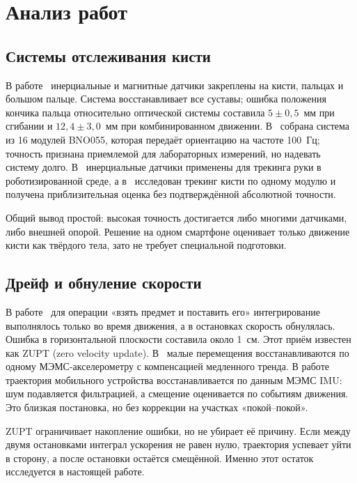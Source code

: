 \documentclass{misisarticle}
\begin{document}
\section{Анализ работ}

\subsection{Системы отслеживания кисти}

В работе~\cite{kortier} инерциальные и магнитные датчики закреплены на кисти, пальцах и большом пальце. Система восстанавливает все суставы; ошибка положения кончика пальца относительно оптической системы составила $5\pm0{,}5$~мм при сгибании и $12{,}4\pm3{,}0$~мм при комбинированном движении. В~\cite{shenoy} собрана система из 16 модулей BNO055, которая передаёт ориентацию на частоте 100~Гц; точность признана приемлемой для лабораторных измерений, но надевать систему долго. В~\cite{pellois} инерциальные датчики применены для трекинга руки в роботизированной среде, а в~\cite{miyazaki} исследован трекинг кисти по одному модулю и получена приблизительная оценка без подтверждённой абсолютной точности.

Общий вывод простой: высокая точность достигается либо многими датчиками, либо внешней опорой. Решение на одном смартфоне оценивает только движение кисти как твёрдого тела, зато не требует специальной подготовки.

\subsection{Дрейф и обнуление скорости}

В работе~\cite{neto} для операции «взять предмет и поставить его» интегрирование выполнялось только во время движения, а в остановках скорость обнулялась. Ошибка в горизонтальной плоскости составила около 1~см. Этот приём известен как ZUPT (zero velocity update). В~\cite{niu} малые перемещения восстанавливаются по одному МЭМС-акселерометру с компенсацией медленного тренда. В работе~\cite{zhang2018} траектория мобильного устройства восстанавливается по данным МЭМС IMU: шум подавляется фильтрацией, а смещение оценивается по событиям движения. Это близкая постановка, но без коррекции на участках «покой--покой».

ZUPT ограничивает накопление ошибки, но не убирает её причину. Если между двумя остановками интеграл ускорения не равен нулю, траектория успевает уйти в сторону, а после остановки остаётся смещённой. Именно этот остаток исследуется в настоящей работе.
\end{document}
